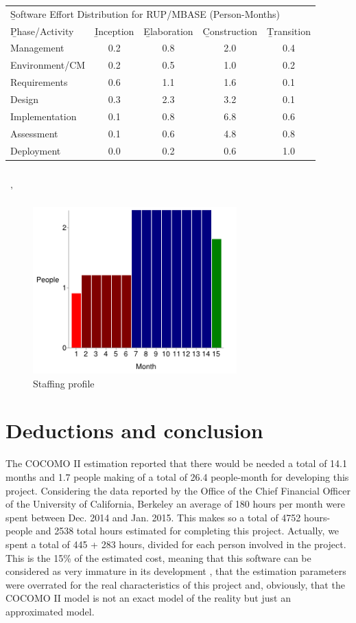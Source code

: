 \begin{tabularx}{\linewidth}{|X|c|c|c|c|}
\hline \multicolumn{5}{|l|}{\b Software Effort Distribution for RUP/MBASE (Person-Months)}\\
\Xhline{4\arrayrulewidth} \b{Phase/Activity} & \b{Inception} & \b{Elaboration} & \b{Construction} & \b{Transition}\\
\Xhline{4\arrayrulewidth} Management & 0.2 & 0.8 & 2.0 & 0.4\\
\hline Environment/CM & 0.2 & 0.5 & 1.0 & 0.2\\
\hline Requirements & 0.6 & 1.1 & 1.6 & 0.1\\
\hline Design & 0.3 & 2.3 & 3.2 & 0.1\\
\hline Implementation & 0.1 & 0.8 & 6.8 & 0.6\\
\hline Assessment & 0.1 & 0.6 & 4.8 & 0.8\\
\hline Deployment & 0.0 & 0.2 & 0.6 & 1.0\\
\hline
\end{tabularx}\\\
'
\begin{figure}[H]
  \centerline{\includegraphics[width=0.7\textwidth]{immagini/chart.png}}
  \caption{Staffing profile}
\end{figure}

\section{Deductions and conclusion}
The COCOMO II estimation reported that there would be needed a total of 14.1 months and 1.7 people making of a total of 26.4 people-month for developing this project. Considering the data reported by the Office of the Chief Financial Officer of the University of California, Berkeley an average of 180 hours per month were spent between Dec. 2014 and Jan. 2015. This makes so a total of 4752 hours-people and 2538 total hours estimated for completing this project. Actually, we spent a total of 445 + 283 hours, divided for each person involved in the project. This is the 15\% of the estimated cost, meaning that this software can be considered as very immature in its development , that the estimation parameters were overrated for the real characteristics of this project and, obviously, that the COCOMO II model is not an exact model of the reality but just an approximated model.